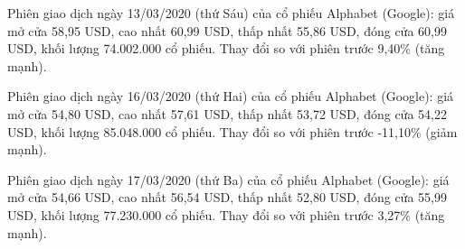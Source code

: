 Phiên giao dịch ngày 13/03/2020 (thứ Sáu) của cổ phiếu Alphabet (Google): giá mở cửa 58,95 USD, cao nhất 60,99 USD, thấp nhất 55,86 USD, đóng cửa 60,99 USD, khối lượng 74.002.000 cổ phiếu. Thay đổi so với phiên trước 9,40\% (tăng mạnh).\par
Phiên giao dịch ngày 16/03/2020 (thứ Hai) của cổ phiếu Alphabet (Google): giá mở cửa 54,80 USD, cao nhất 57,61 USD, thấp nhất 53,72 USD, đóng cửa 54,22 USD, khối lượng 85.048.000 cổ phiếu. Thay đổi so với phiên trước -11,10\% (giảm mạnh).\par
Phiên giao dịch ngày 17/03/2020 (thứ Ba) của cổ phiếu Alphabet (Google): giá mở cửa 54,66 USD, cao nhất 56,54 USD, thấp nhất 52,80 USD, đóng cửa 55,99 USD, khối lượng 77.230.000 cổ phiếu. Thay đổi so với phiên trước 3,27\% (tăng mạnh).\par
